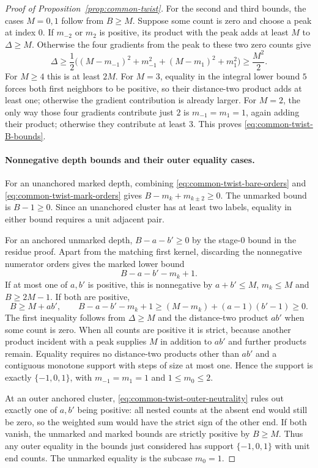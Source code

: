\begin{proof}[Proof of Proposition~\ref{prop:common-twist}]
For the second and third bounds, the cases $M=0,1$ follow from
$B\ge M$. Suppose some count is zero and choose a peak at index $0$.
If $m_{-2}$ or $m_2$ is positive, its product with the peak adds
at least $M$ to $\Delta\ge M$. Otherwise the four gradients from
the peak to these two zero counts give
\[
 \Delta\ge\frac12\bigl((M-m_{-1})^2+m_{-1}^2
                       +(M-m_1)^2+m_1^2\bigr)\ge\frac{M^2}{2}.
\]
For $M\ge4$ this is at least $2M$. For $M=3$, equality in the
integral lower bound $5$ forces both first neighbors to be positive,
so their distance-two product adds at least one; otherwise the
gradient contribution is already larger. For $M=2$, the only way
those four gradients contribute just $2$ is $m_{-1}=m_1=1$,
again adding their product; otherwise they contribute at least $3$.
This proves \eqref{eq:common-twist-B-bounds}.

\paragraph{Nonnegative depth bounds and their outer equality cases.}
For an unanchored marked depth, combining
\eqref{eq:common-twist-bare-orders} and
\eqref{eq:common-twist-mark-orders} gives
$B-m_k+m_{k\pm2}\ge0$. The unmarked bound is $B-1\ge0$.
Since an unanchored cluster has at least two labels, equality in
either bound requires a unit adjacent pair.

For an anchored unmarked depth, $B-a-b'\ge0$ by the stage-$0$
bound in the residue proof. Apart from the matching first kernel,
discarding the nonnegative numerator orders gives the marked lower
bound
\begin{equation}\label{eq:common-twist-anchored-bound}
 B-a-b'-m_k+1.
\end{equation}
If at most one of $a,b'$ is positive, this is nonnegative by
$a+b'\le M$, $m_k\le M$ and $B\ge2M-1$. If both are positive,
\[
 B\ge M+ab',\qquad
 B-a-b'-m_k+1\ge (M-m_k)+(a-1)(b'-1)\ge0.
\]
The first inequality follows from $\Delta\ge M$ and the
distance-two product $ab'$ when some count is zero. When all counts
are positive it is strict, because another product incident with
a peak supplies $M$ in addition to $ab'$ and further products remain.
Equality requires no distance-two products other than $ab'$ and a
contiguous monotone support with steps of size at most one. Hence
the support is exactly $\{-1,0,1\}$, with
$m_{-1}=m_1=1$ and $1\le m_0\le2$.

At an outer anchored cluster, \eqref{eq:common-twist-outer-neutrality}
rules out exactly one of $a,b'$ being positive: all nested counts
at the absent end would still be zero, so the weighted sum would
have the strict sign of the other end. If both vanish, the
unmarked and marked bounds are strictly positive by $B\ge M$.
Thus any outer equality in the bounds just considered has support
$\{-1,0,1\}$ with unit end counts. The unmarked equality is the
subcase $m_0=1$.


\end{proof}
